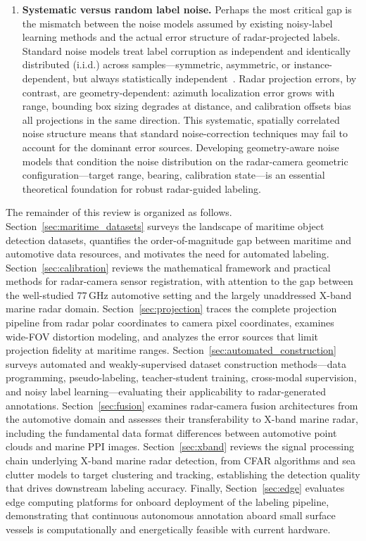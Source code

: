 \begin{enumerate}[leftmargin=*]
\item \textbf{Systematic versus random label noise.}
Perhaps the most critical gap is the mismatch between the noise models assumed by existing noisy-label learning methods and the actual error structure of radar-projected labels. Standard noise models treat label corruption as independent and identically distributed (i.i.d.) across samples---symmetric, asymmetric, or instance-dependent, but always statistically independent~\cite{natarajan2013learning,cheng2022instance}. Radar projection errors, by contrast, are geometry-dependent: azimuth localization error grows with range, bounding box sizing degrades at distance, and calibration offsets bias all projections in the same direction. This systematic, spatially correlated noise structure means that standard noise-correction techniques may fail to account for the dominant error sources. Developing geometry-aware noise models that condition the noise distribution on the radar-camera geometric configuration---target range, bearing, calibration state---is an essential theoretical foundation for robust radar-guided labeling.

\end{enumerate}

The remainder of this review is organized as follows. Section~\ref{sec:maritime_datasets} surveys the landscape of maritime object detection datasets, quantifies the order-of-magnitude gap between maritime and automotive data resources, and motivates the need for automated labeling. Section~\ref{sec:calibration} reviews the mathematical framework and practical methods for radar-camera sensor registration, with attention to the gap between the well-studied 77\,GHz automotive setting and the largely unaddressed X-band marine radar domain. Section~\ref{sec:projection} traces the complete projection pipeline from radar polar coordinates to camera pixel coordinates, examines wide-FOV distortion modeling, and analyzes the error sources that limit projection fidelity at maritime ranges. Section~\ref{sec:automated_construction} surveys automated and weakly-supervised dataset construction methods---data programming, pseudo-labeling, teacher-student training, cross-modal supervision, and noisy label learning---evaluating their applicability to radar-generated annotations. Section~\ref{sec:fusion} examines radar-camera fusion architectures from the automotive domain and assesses their transferability to X-band marine radar, including the fundamental data format differences between automotive point clouds and marine PPI images. Section~\ref{sec:xband} reviews the signal processing chain underlying X-band marine radar detection, from CFAR algorithms and sea clutter models to target clustering and tracking, establishing the detection quality that drives downstream labeling accuracy. Finally, Section~\ref{sec:edge} evaluates edge computing platforms for onboard deployment of the labeling pipeline, demonstrating that continuous autonomous annotation aboard small surface vessels is computationally and energetically feasible with current hardware.
